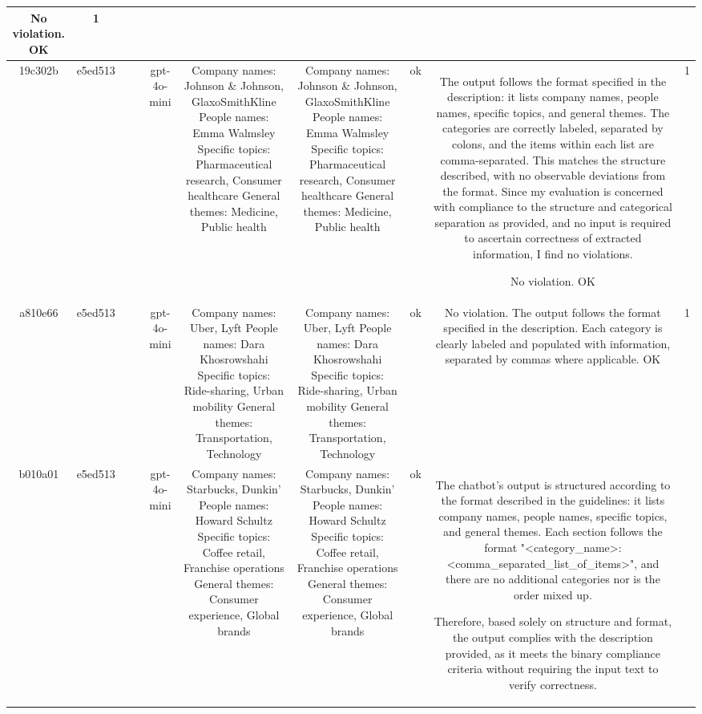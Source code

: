 \begin{table}[h!]
\begin{tabular}{|c|c|c|c|c|c|c|c|c|c|}
No violation.
OK & 1\\
\hline
19c302b & e5ed513 &  &  & gpt-4o-mini & Company names: Johnson \& Johnson, GlaxoSmithKline
People names: Emma Walmsley
Specific topics: Pharmaceutical research, Consumer healthcare
General themes: Medicine, Public health & Company names: Johnson \& Johnson, GlaxoSmithKline  
People names: Emma Walmsley  
Specific topics: Pharmaceutical research, Consumer healthcare  
General themes: Medicine, Public health   & ok & The output follows the format specified in the description: it lists company names, people names, specific topics, and general themes. The categories are correctly labeled, separated by colons, and the items within each list are comma-separated. This matches the structure described, with no observable deviations from the format. Since my evaluation is concerned with compliance to the structure and categorical separation as provided, and no input is required to ascertain correctness of extracted information, I find no violations.

No violation.
OK & 1\\
\hline
a810e66 & e5ed513 &  &  & gpt-4o-mini & Company names: Uber, Lyft
People names: Dara Khosrowshahi
Specific topics: Ride-sharing, Urban mobility
General themes: Transportation, Technology & Company names: Uber, Lyft  
People names: Dara Khosrowshahi  
Specific topics: Ride-sharing, Urban mobility  
General themes: Transportation, Technology   & ok & No violation. The output follows the format specified in the description. Each category is clearly labeled and populated with information, separated by commas where applicable. 
OK & 1\\
\hline
b010a01 & e5ed513 &  &  & gpt-4o-mini & Company names: Starbucks, Dunkin'
People names: Howard Schultz
Specific topics: Coffee retail, Franchise operations
General themes: Consumer experience, Global brands & Company names: Starbucks, Dunkin'
People names: Howard Schultz
Specific topics: Coffee retail, Franchise operations
General themes: Consumer experience, Global brands & ok & The chatbot's output is structured according to the format described in the guidelines: it lists company names, people names, specific topics, and general themes. Each section follows the format "<category_name>: <comma_separated_list_of_items>", and there are no additional categories nor is the order mixed up. 

Therefore, based solely on structure and format, the output complies with the description provided, as it meets the binary compliance criteria without requiring the input text to verify correctness.


\end{tabular}
\end{table}
